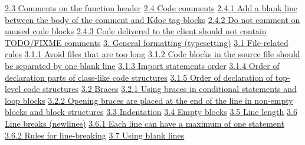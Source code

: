\hspace{0.5cm}\hyperref[sec:2.3]{ 2.3 Comments on the function header}
\hspace{0.5cm}\hyperref[sec:2.4]{ 2.4 Code comments}
\hspace{1.0cm}\hyperref[sec:2.4.1]{ 2.4.1 Add a blank line between the body of the comment and Kdoc tag-blocks}
\hspace{1.0cm}\hyperref[sec:2.4.2]{ 2.4.2 Do not comment on unused code blocks}
\hspace{1.0cm}\hyperref[sec:2.4.3]{ 2.4.3 Code delivered to the client should not contain TODO/FIXME comments}
\hspace{1.0cm}\hyperref[sec:]{}
\hspace{0.0cm}\hyperref[sec:3.]{3. General formatting (typesetting)}
\hspace{0.5cm}\hyperref[sec:3.1]{ 3.1 File-related rules}
\hspace{1.0cm}\hyperref[sec:3.1.1]{ 3.1.1 Avoid files that are too long}
\hspace{1.0cm}\hyperref[sec:3.1.2]{ 3.1.2 Code blocks in the source file should be separated by one blank line}
\hspace{1.0cm}\hyperref[sec:3.1.3]{ 3.1.3 Import statements order}
\hspace{1.0cm}\hyperref[sec:3.1.4]{ 3.1.4 Order of declaration parts of class-like code structures}
\hspace{1.0cm}\hyperref[sec:3.1.5]{ 3.1.5 Order of declaration of top-level code structures}
\hspace{0.5cm}\hyperref[sec:3.2]{ 3.2 Braces}
\hspace{1.0cm}\hyperref[sec:3.2.1]{ 3.2.1 Using braces in conditional statements and loop blocks}
\hspace{1.0cm}\hyperref[sec:3.2.2]{ 3.2.2 Opening braces are placed at the end of the line in non-empty blocks and block structures}
\hspace{0.5cm}\hyperref[sec:3.3]{ 3.3 Indentation}
\hspace{0.5cm}\hyperref[sec:3.4]{ 3.4 Empty blocks}
\hspace{0.5cm}\hyperref[sec:3.5]{ 3.5 Line length}
\hspace{0.5cm}\hyperref[sec:3.6]{ 3.6 Line breaks (newlines)}
\hspace{1.0cm}\hyperref[sec:3.6.1]{ 3.6.1 Each line can have a maximum of one statement}
\hspace{1.0cm}\hyperref[sec:3.6.2]{ 3.6.2 Rules for line-breaking}
\hspace{0.5cm}\hyperref[sec:3.7]{ 3.7 Using blank lines}
